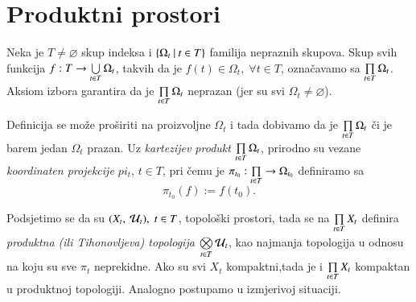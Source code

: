
\chapter{Produktni prostori}

Neka je $T \neq \varnothing$ skup indeksa i $\{{\Omega_t} \: | \: {t \in T}\}$ familija nepraznih skupova.
Skup svih funkcija $f: T \to \bigcup\limits_{t \in T}^{} \Omega_t$, takvih da je $f(t) \in \Omega_t, \; \forall t \in T$, ozna\v cavamo sa $\prod\limits_{t \in T}^{} \Omega_t$.
Aksiom izbora garantira da je $\prod\limits_{t \in T}^{} \Omega_t$ neprazan (jer su svi $\Omega_t \neq \varnothing$).

Definicija se mo\v ze pro\v siriti na proizvoljne $\Omega_t$ i tada dobivamo da je $\prod\limits_{t \in T}^{} \Omega_t$ \v ci je barem jedan $\Omega_t$ prazan.
Uz \emph{kartezijev produkt} $\prod\limits_{t \in T}^{} \Omega_t$, prirodno su vezane \emph{koordinaten projekcije $pi_t$}, $t \in T$, pri \v cemu je $\pi_{t_0}: \prod\limits_{t \in T}^{} \to \Omega_{t_0}$ definiramo sa
\begin{equation*}
    \pi_{t_0} (f) := f(t_0).
\end{equation*}

Podsjetimo se da su $(X_t, \: \mathcal{U}_t), \; t \in T$, topolo\v ski prostori, tada se na $\prod\limits_{t \in T}^{} X_t$ definira \emph{produktna (ili Tihonovljeva) topologija} $\bigotimes\limits_{t \in T}^{} \mathcal{U}_t$, kao najmanja topologija u odnosu na koju su sve $\pi_t$ neprekidne.
Ako su svi $X_t$ kompaktni,tada je i $\prod\limits_{t \in T}^{} X_t$ kompaktan u produktnoj topologiji.
Analogno postupamo u izmjerivoj situaciji.

